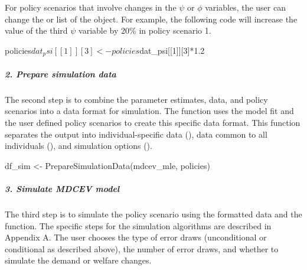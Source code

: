 \begin{Schunk}
\end{Schunk}

For policy scenarios that involve changes in the \(\psi\) or \(\phi\)
variables, the user can change the  or 
list of the  object. For example, the following code will
increase the value of the third \(\psi\) variable by 20\% in policy
scenario 1.

\begin{Schunk}
\begin{Sinput}
policies$dat_psi[[1]][3] <- policies$dat_psi[[1]][3]*1.2
\end{Sinput}
\end{Schunk}

\hypertarget{prepare-simulation-data}{%
\subparagraph{2. Prepare simulation
data}\label{prepare-simulation-data}}

The second step is to combine the parameter estimates, data, and policy
scenarios into a data format for simulation. The
 function uses the model fit and the user
defined policy scenarios to create this specific data format. This
function separates the output into individual-specific data
(), data common to all individuals (),
and simulation options ().

\begin{Schunk}
\begin{Sinput}
df_sim <- PrepareSimulationData(mdcev_mle, policies)
\end{Sinput}
\end{Schunk}

\hypertarget{simulate-mdcev-model}{%
\subparagraph{3. Simulate MDCEV model}\label{simulate-mdcev-model}}

The third step is to simulate the policy scenario using the formatted
data and the  function. The specific steps for the
simulation algorithms are described in Appendix A. The user chooses the
type of error draws (unconditional or conditional as described above),
the number of error draws, and whether to simulate the demand or welfare
changes.


